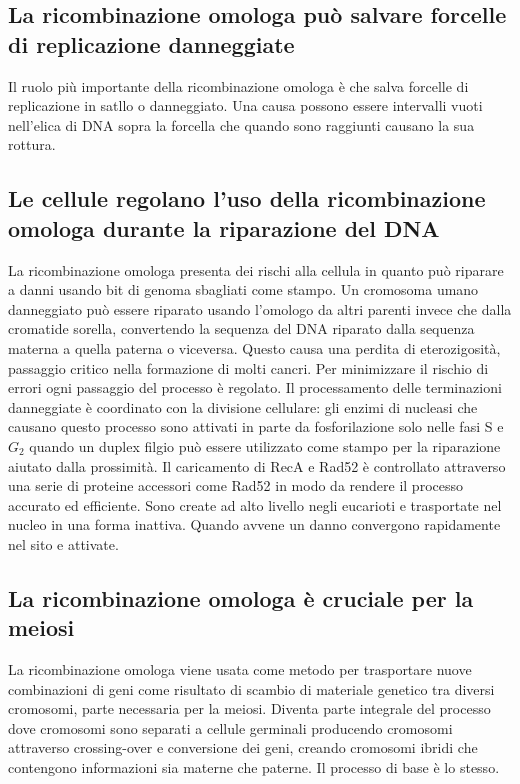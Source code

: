 \subsection{La ricombinazione omologa pu\`o salvare forcelle di replicazione danneggiate}
Il ruolo pi\`u importante della ricombinazione omologa \`e che salva forcelle di replicazione in satllo o danneggiato. Una causa possono essere intervalli vuoti nell'elica di DNA 
sopra la forcella che quando sono raggiunti causano la sua rottura. 
\subsection{Le cellule regolano l'uso della ricombinazione omologa durante la riparazione del DNA}
La ricombinazione omologa presenta dei rischi alla cellula in quanto pu\`o riparare a danni usando bit di genoma sbagliati come stampo. Un cromosoma umano danneggiato pu\`o essere 
riparato usando l'omologo da altri parenti invece che dalla cromatide sorella, convertendo la sequenza del DNA riparato dalla sequenza materna a quella paterna o viceversa. Questo causa 
una perdita di eterozigosit\`a, passaggio critico nella formazione di molti cancri. Per minimizzare il rischio di errori ogni passaggio del processo \`e regolato. Il processamento delle
terminazioni danneggiate \`e coordinato con la divisione cellulare: gli enzimi di nucleasi che causano questo processo sono attivati in parte da fosforilazione solo nelle fasi S e $G_2$
quando un duplex filgio pu\`o essere utilizzato come stampo per la riparazione aiutato dalla prossimit\`a. Il caricamento di RecA e Rad52 \`e controllato attraverso una serie di 
proteine accessori come Rad52 in modo da rendere il processo accurato ed efficiente. Sono create ad alto livello negli eucarioti e trasportate nel nucleo in una forma inattiva. Quando
avvene un danno convergono rapidamente nel sito e attivate. 
\subsection{La ricombinazione omologa \`e cruciale per la meiosi}
La ricombinazione omologa viene usata come metodo per trasportare nuove combinazioni di geni come risultato di scambio di materiale genetico tra diversi cromosomi, parte necessaria per
la meiosi. Diventa parte integrale del processo dove cromosomi sono separati a cellule germinali producendo cromosomi attraverso crossing-over e conversione dei geni, creando 
cromosomi ibridi che contengono informazioni sia materne che paterne. Il processo di base \`e lo stesso.
